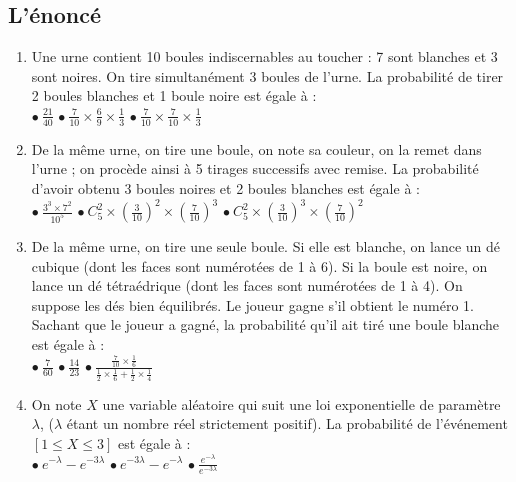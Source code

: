 \documentclass[a4paper,11pt]{book}
\begin{document}
\subsection{L'\'enonc\'e}
\begin{enumerate}
\item Une urne contient 10 boules indiscernables au toucher : 7 sont blanches 
et 3 sont noires. On tire simultan\'ement 3 boules de l'urne. La probabilit\'e
de tirer 2 boules blanches et 1 boule noire est \'egale \`a :\\
$\displaystyle \bullet\ \frac{21}{40}$ \hspace*{1cm}$\displaystyle \bullet\ \frac{7}{10}\times\frac{6}{9}\times\frac{1}{3}$ \hspace*{1cm}$\displaystyle\bullet\ \frac{7}{10}\times\frac{7}{10}\times\frac{1}{3}$
\item De la m\^eme urne, on tire une boule, on note sa couleur, on la remet 
dans l'urne ; on proc\`ede ainsi \`a 5 tirages successifs avec remise. 
La probabilit\'e d'avoir obtenu 3 boules noires et 2 boules blanches est 
\'egale \`a :\\
$\displaystyle \bullet\ \frac{3^3\times7^2}{10^5}$ \hspace*{1cm}
$\displaystyle \bullet\ C_5^2\times{(\frac{3}{10})}^2\times{(\frac{7}{10})}^3$ \hspace*{1cm}
$\displaystyle \bullet\ C_5^2\times{(\frac{3}{10})}^3\times{(\frac{7}{10})}^2$
\item De la m\^eme urne, on tire une seule boule. Si elle est blanche, on lance
un d\'e cubique (dont les faces sont num\'erot\'ees de 1 \`a 6). Si la boule 
est noire, on lance un d\'e t\'etra\'edrique (dont les faces sont 
num\'erot\'ees de 1 \`a 4). On suppose les d\'es bien \'equilibr\'es. Le joueur
gagne s'il obtient le num\'ero 1.\\
Sachant que le joueur a gagn\'e, la probabilit\'e qu'il ait tir\'e une boule 
blanche est \'egale \`a :\\
$\displaystyle \bullet\ \frac{7}{60}$ \hspace*{1cm}$\displaystyle \bullet\ \frac{14}{23}$ \hspace*{1cm}
$\displaystyle \bullet\ \frac{\displaystyle \frac{7}{10}\times\frac{1}{6}}{\displaystyle \frac{1}{2}\times \frac{1}{6}+\frac{1}{2}\times \frac{1}{4}}$
\item On note $X$ une variable al\'eatoire qui suit une loi exponentielle de 
param\`etre $\lambda$, ($\lambda$ \'etant un nombre r\'eel strictement positif).
La probabilit\'e de l'\'ev\'enement $[1\leq X \leq 3]$ est \'egale \`a :\\
$\bullet\ e^{-\lambda}-e^{-3\lambda}$ \hspace*{1cm}
$\bullet\ e^{-3\lambda}-e^{-\lambda}$ \hspace*{1cm}
$\displaystyle \bullet\ \frac{e^{-\lambda}}{e^{-3\lambda}}$     
\end{enumerate}
\end{document}
